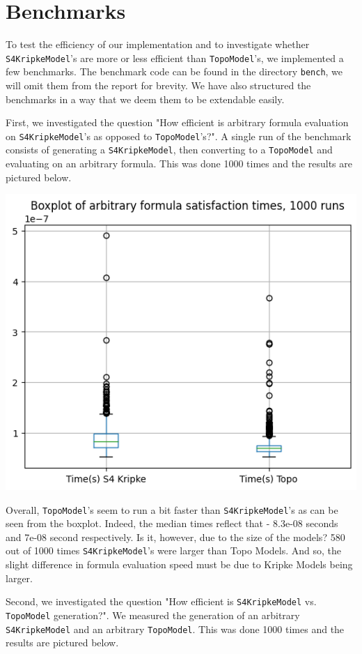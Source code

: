 \documentclass[12pt,a4paper]{article}
\begin{document}
\section{Benchmarks}\label{sec:Benchmarks}

To test the efficiency of our implementation and to investigate whether \verb|S4KripkeModel|'s
are more or less efficient than \verb|TopoModel|'s, we implemented a few benchmarks. The benchmark code
can be found in the directory \verb|bench|, we will omit them from the report for brevity. We have also
structured the benchmarks in a way that we deem them to be extendable easily.

First, we investigated the question "How efficient is arbitrary formula evaluation on \verb|S4KripkeModel|'s
as opposed to \verb|TopoModel|'s?". A single run of the benchmark consists of generating a \verb|S4KripkeModel|,
then converting to a \verb|TopoModel| and evaluating on an arbitrary formula. This was done 1000 times and the
results are pictured below.

\begin{center}
\includegraphics*[width=0.5\linewidth]{bench-formula-satisfaction.png}
\end{center}

Overall, \verb|TopoModel|'s seem to run a bit faster than \verb|S4KripkeModel|'s as can be seen from the boxplot.
Indeed, the median times reflect that - 8.3e-08 seconds and 7e-08 second respectively.
Is it, however, due to the size of the models? 580 out of 1000 times \verb|S4KripkeModel|'s were larger
than Topo Models. And so, the slight difference in formula evaluation speed must be due to
Kripke Models being larger.

Second, we investigated the question "How efficient is \verb|S4KripkeModel| vs. \verb|TopoModel| generation?".
We measured the generation of an arbitrary \verb|S4KripkeModel| and an arbitrary \verb|TopoModel|.
This was done 1000 times and the results are pictured below.
\end{document}
